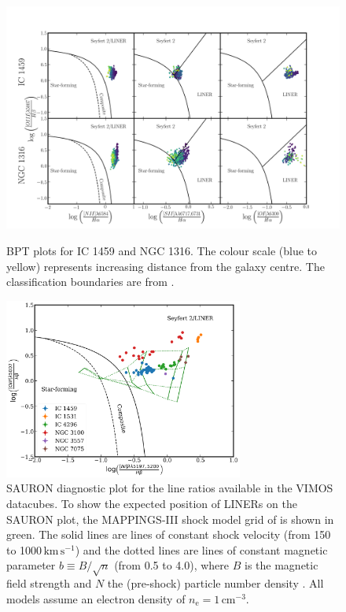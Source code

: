 		\begin{figure}
			\centering
			\includegraphics[width=.9\textwidth]{chapter5/BPT.png}
			\caption[BPT plots]{BPT plots for IC 1459 and NGC 1316. The colour scale (blue to yellow) represents increasing distance from the galaxy centre. The classification boundaries are from \citet{Kewley2006}.\label{fig:BPT}}

			\includegraphics[width=0.7\textwidth]{chapter5/SAURON.png}
			\caption[An alternative diagnostic plot]{SAURON diagnostic plot for the line ratios available in the VIMOS datacubes. To show the expected position of LINERs on the SAURON plot, the MAPPINGS-III shock model grid of \citet{Allen2008} is shown in green. The solid lines are lines of constant shock velocity (from 150 to 1000\,$\mathrm{km\,s^{-1}}$) and the dotted lines are lines of constant magnetic parameter $b \equiv B/\sqrt{n}$ (from 0.5 to 4.0), where $B$ is the magnetic field strength and $N$ the (pre-shock) particle number density \citep{Dopita1996}. All models assume an electron density of $n_\mathrm{e} = 1\,\mathrm{cm^{-3}}$.\label{fig:SAURON}}
		\end{figure}

